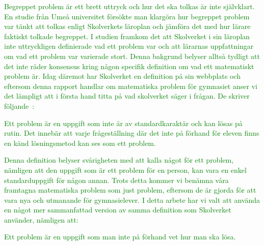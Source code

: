 
\textcolor{green}{Begreppet problem är ett brett uttryck och hur det ska tolkas är inte självklart. En studie från Umeå universitet \cite{problemVarierandeDef} försökte man klargöra hur begreppet problem var tänkt att tolkas enligt Skolverkets läroplan och jämföra det med hur lärare faktiskt tolkade begreppet. I studien framkom det att Skolverket i sin läroplan inte uttryckligen definierade vad ett problem var och att lärarnas uppfattningar om vad ett problem var varierade stort. Denna bakgrund belyser alltså tydligt att det inte råder konsensus kring någon specifik definition om vad ett matematiskt problem är. Idag däremot har Skolverket en definition på sin webbplats och eftersom denna rapport handlar om matematiska problem för gymnasiet anser vi det lämpligt att i första hand titta på vad skolverket säger i frågan. De skriver följande~\cite{ProblemDef}:}

\begin{displayquote}
\textcolor{green}{Ett problem är en uppgift som inte är av standardkaraktär och kan lösas på rutin. Det innebär att varje frågeställning där det inte på förhand för eleven finns en känd lösningsmetod kan ses som ett problem.}
\end{displayquote}

\noindent\textcolor{green}{Denna definition belyser svårigheten med att kalla något för ett problem, nämligen att den uppgift som är ett problem för en person, kan vara en enkel standarduppgift för någon annan. Trots detta kommer vi benämna våra framtagna matematiska problem som just problem, eftersom de är gjorda för att vara nya och utmanande för gymnasielever.} 
\textcolor{green}{I detta arbete har vi valt att använda en något mer sammanfattad version av samma definition som Skolverket använder, nämligen att:}

\begin{displayquote}
\textcolor{green}{Ett problem är en uppgift som man inte på förhand vet hur man ska lösa.}
\end{displayquote}

\noindent %

